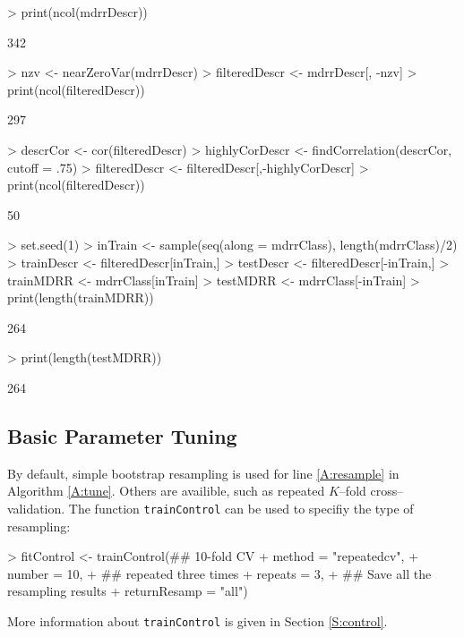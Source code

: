 \documentclass[12pt]{article}
\newcommand{\code}[1]{\mbox{\footnotesize\color{darkblue}\texttt{#1}}}
\renewenvironment{Schunk}{\vspace{\topsep}}{\vspace{\topsep}}
\begin{document}
\begin{small}
\begin{Schunk}
\begin{Sinput}
> print(ncol(mdrrDescr))
\end{Sinput}
\begin{Soutput}
[1] 342
\end{Soutput}
\begin{Sinput}
> nzv <- nearZeroVar(mdrrDescr)
> filteredDescr <- mdrrDescr[, -nzv]
> print(ncol(filteredDescr))
\end{Sinput}
\begin{Soutput}
[1] 297
\end{Soutput}
\begin{Sinput}
> descrCor <- cor(filteredDescr)
> highlyCorDescr <- findCorrelation(descrCor, cutoff = .75)
> filteredDescr <- filteredDescr[,-highlyCorDescr]
> print(ncol(filteredDescr))
\end{Sinput}
\begin{Soutput}
[1] 50
\end{Soutput}
\begin{Sinput}
> set.seed(1)
> inTrain <- sample(seq(along = mdrrClass), length(mdrrClass)/2)
> trainDescr <- filteredDescr[inTrain,]
> testDescr <- filteredDescr[-inTrain,]
> trainMDRR <- mdrrClass[inTrain]
> testMDRR <- mdrrClass[-inTrain]
> print(length(trainMDRR))
\end{Sinput}
\begin{Soutput}
[1] 264
\end{Soutput}
\begin{Sinput}
> print(length(testMDRR))
\end{Sinput}
\begin{Soutput}
[1] 264
\end{Soutput}
\end{Schunk}
\end{small}

\subsection{Basic Parameter Tuning}\label{S:basic}

By default, simple bootstrap resampling is used for line
\ref{A:resample} in Algorithm \ref{A:tune}. Others are availible, such
as repeated $K$--fold cross--validation. The function
\code{trainControl} can be used to specifiy the type of resampling:

\begin{small}
\begin{Schunk}
\begin{Sinput}
> fitControl <- trainControl(## 10-fold CV
+                            method = "repeatedcv",
+                            number = 10,
+                            ## repeated three times
+                            repeats = 3,
+                            ## Save all the resampling results
+                            returnResamp = "all")
\end{Sinput}
\end{Schunk}
\end{small}
More information about \code{trainControl} is given in Section
\ref{S:control}. 
\end{document}
